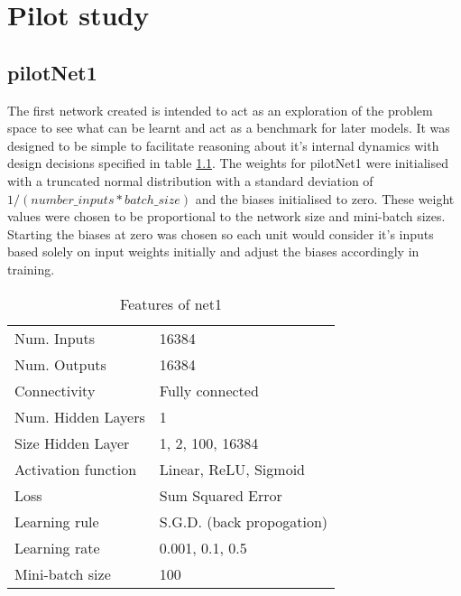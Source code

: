 \chapter{Pilot study}
\label{ch:pilot}

\section{pilotNet1}



The first network created is intended to act as an exploration of the problem space to see what can be learnt and act as a benchmark for later models. 
It was designed to be simple to facilitate reasoning about it's internal dynamics with design decisions specified in table \ref{table:net1def}.
The weights for pilotNet1 were initialised with a truncated normal distribution with a standard deviation of $1 / ( number\_inputs * batch\_size )$ and the biases initialised to zero.
These weight values were chosen to be proportional to the network size and mini-batch sizes. 
Starting the biases at zero was chosen so each unit would consider it's inputs based solely on input weights initially and adjust the biases accordingly in training. 

\begin{table}[h]
\centering
\begin{tabular}{ | l | l | }
    \hline
    Num. Inputs & 16384 \\
    Num. Outputs & 16384 \\
    Connectivity & Fully connected \\
    Num. Hidden Layers & 1 \\
    Size Hidden Layer & 1, 2, 100, 16384  \\
    Activation function & Linear, ReLU, Sigmoid \\
    Loss & Sum Squared Error \\
    Learning rule & S.G.D. (back propogation) \\
    Learning rate & 0.001, 0.1, 0.5 \\
    Mini-batch size & 100 \\
    \hline
\end{tabular}
\caption{Features of net1}
\label{table:net1def}
\end{table}

